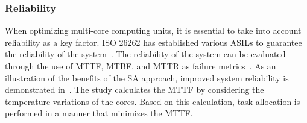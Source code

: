 \subsubsection{Reliability} %
When optimizing multi-core computing units, it is essential to take into account reliability as a key factor. ISO 26262 has established various ASILs to guarantee the reliability of the system~\cite{iso26262}. The reliability of the system can be evaluated through the use of MTTF, MTBF, and MTTR as failure metrics~\cite{das2014communication}. As an illustration of the benefits of the SA approach, improved system reliability is demonstrated in~\cite{huang2009lifetime}. The study calculates the MTTF by considering the temperature variations of the cores. Based on this calculation, task allocation is performed in a manner that minimizes the MTTF.





